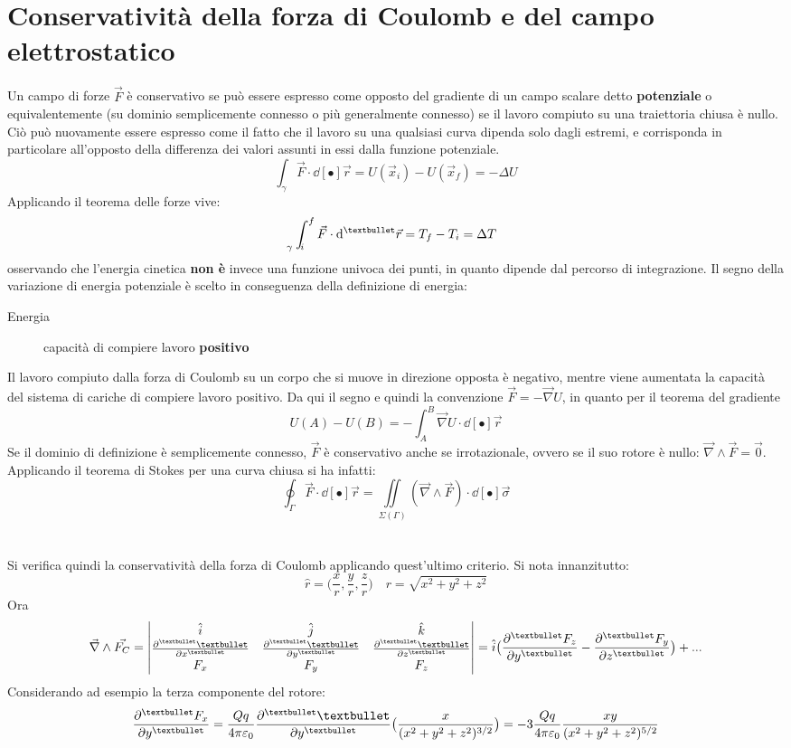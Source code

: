 \section{Conservatività della forza di Coulomb e del campo elettrostatico}
Un campo di forze $\vec{F}$ è conservativo se può essere espresso come opposto del gradiente di un campo scalare detto \textbf{potenziale} o equivalentemente (su dominio semplicemente connesso o più generalmente connesso) se il lavoro compiuto su una traiettoria chiusa è nullo.
\\Ciò può nuovamente essere espresso come il fatto che il lavoro su una qualsiasi curva dipenda solo dagli estremi, e corrisponda in particolare all'opposto della differenza dei valori assunti in essi dalla funzione potenziale.
\[\int_\gamma \vec{F} \cdot \dd[•]{\vec{r}} = U(\vec{x}_i) - U(\vec{x}_f) = - \Delta U\]
Applicando il teorema delle forze vive:
\[\int_{\hspace{-0.45cm} \gamma \hspace{0.22cm} i}^f \vec{F} \cdot \dd[•]{\vec{r}} = T_f - T_i = \Delta T\]
osservando che l'energia cinetica \textbf{non è} invece una funzione univoca dei punti, in quanto dipende dal percorso di integrazione. Il segno della variazione di energia potenziale è scelto in conseguenza della definizione di energia:
\begin{description}
\item[Energia] capacità di compiere lavoro \textbf{positivo}
\end{description}
Il lavoro compiuto dalla forza di Coulomb su un corpo che si muove in direzione opposta è negativo, mentre viene aumentata la capacità del sistema di cariche di compiere lavoro positivo. Da qui il segno e quindi la convenzione $\vec{F} = - \vec{\nabla} U$, in quanto per il teorema del gradiente
\[U(A) - U(B) = - \int_A^B \vec{\nabla} U \cdot \dd[•]{\vec{r}}\]
Se il dominio di definizione è semplicemente connesso, $\vec{F}$ è conservativo anche se irrotazionale, ovvero se il suo rotore è nullo: $\displaystyle \vec{\nabla} \wedge \vec{F} = \vec{0}$. Applicando il teorema di Stokes per una curva chiusa si ha infatti:
\[\oint_\Gamma \vec{F} \cdot	\dd[•]{\vec{r}} = \iint\limits_{\Sigma(\Gamma)} (\vec{\nabla} \wedge \vec{F}) \cdot \dd[•]{\vec{\sigma}}\]
\\~\\
Si verifica quindi la conservatività della forza di Coulomb applicando quest'ultimo criterio. Si nota innanzitutto:
\[\hat{r} = \big(\frac{x}{r},\frac{y}{r},\frac{z}{r} \big) \quad r = \sqrt{x^2 + y^2 + z^2}\]
Ora
\[\vec{\nabla} \wedge \vec{F_C} = \begin{vmatrix}
\hat{i} & \hat{j} & \hat{k} \\ \pdv[•]{•}{x} & \pdv[•]{•}{y} & \pdv[•]{•}{z} \\ F_x & F_y & F_z
\end{vmatrix} = \hat{i} \big(\pdv[•]{F_z}{y} - \pdv[•]{F_y}{z}\big) + ...\]
Considerando ad esempio la terza componente del rotore:
\[ \pdv[•]{F_x}{y} = \frac{Qq}{4 \pi \varepsilon_0} \pdv[•]{•}{y} \big(\frac{x}{(x^2 + y^2 + z^2)^{3/2}}\big) = - 3 \frac{Qq}{4 \pi \varepsilon_0} \frac{xy}{(x^2 + y^2 + z^2)^{5/2}}\] 


